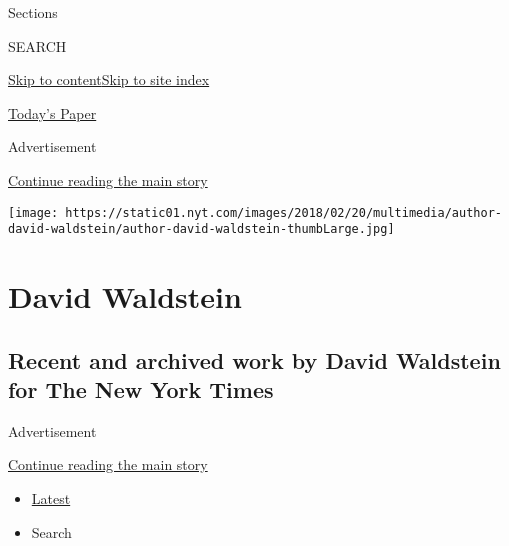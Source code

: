 Sections

SEARCH

\protect\hyperlink{site-content}{Skip to
content}\protect\hyperlink{site-index}{Skip to site index}

\href{https://myaccount.nytimes.com/auth/login?response_type=cookie\&client_id=vi}{}

\href{https://www.nytimes.com/section/todayspaper}{Today's Paper}

Advertisement

\protect\hyperlink{after-top}{Continue reading the main story}

\texttt{[image: https://static01.nyt.com/images/2018/02/20/multimedia/author-david-waldstein/author-david-waldstein-thumbLarge.jpg]}

\hypertarget{david-waldstein}{%
\section{David Waldstein}\label{david-waldstein}}

\hypertarget{recent-and-archived-work-by-david-waldstein-for-the-new-york-times}{%
\subsection{Recent and archived work by David Waldstein for The New York
Times}\label{recent-and-archived-work-by-david-waldstein-for-the-new-york-times}}

Advertisement

\protect\hyperlink{after-mid1}{Continue reading the main story}

\begin{itemize}
\tightlist
\item
  \protect\hyperlink{stream-panel}{Latest}
\item
  Search
\end{itemize}

